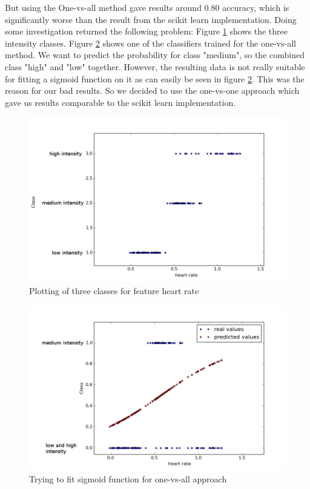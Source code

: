 \documentclass[12pt, a4paper, onecolumn, oneside, parskip=half]{scrartcl}
\begin{document}
But using the One-vs-all method gave results around 0.80 accuracy, which is significantly worse than the result from the scikit learn implementation. Doing some investigation returned the following problem: \newline
Figure \ref{multi-class-data} shows the three intensity classes. Figure \ref{one-vs-all} shows one of the classifiers trained for the one-vs-all method. We want to predict the probability for class "medium", so the combined class "high" and "low" together. However, the resulting data is not really suitable for fitting a sigmoid function on it  as can easily be seen in figure \ref{one-vs-all}. This was the reason for our bad results. So we decided to use the one-vs-one approach which gave us results comparable to the scikit learn implementation.

\begin{figure}[ht!]
  \centering
  \includegraphics[width=130mm]{pictures/plot_multiclass_data.png}
  \caption{Plotting of three classes for feature heart rate \label{multi-class-data}}
\end{figure}

\begin{figure}[ht!]
  \centering
  \includegraphics[width=130mm]{pictures/one-vs-all_classification.png}
  \caption{Trying to fit sigmoid function for one-vs-all approach \label{one-vs-all}}
\end{figure}
\end{document}
